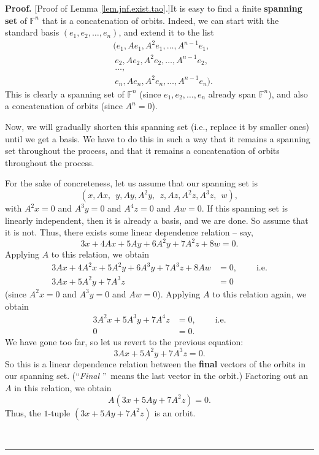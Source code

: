 \documentclass[numbers=enddot,12pt,final,onecolumn,notitlepage]{scrartcl}%
\numberwithin{exer}{subsection}
\theoremstyle{definition}
\newenvironment{proof}[1][Proof]{\noindent\textbf{#1.} }{\ \rule{0.5em}{0.5em}}
\begin{document}
\begin{proof}
[Proof of Lemma \ref{lem.jnf.exist.tao}.]It is easy to find a finite
\textbf{spanning set} of $\mathbb{F}^{n}$ that is a concatenation of orbits.
Indeed, we can start with the standard basis $\left(  e_{1},e_{2},\ldots
,e_{n}\right)  $, and extend it to the list%
\begin{align*}
&  (e_{1},Ae_{1},A^{2}e_{1},\ldots,A^{n-1}e_{1},\\
&  \ e_{2},Ae_{2},A^{2}e_{2},\ldots,A^{n-1}e_{2},\\
&  \ \ldots,\\
&  \ e_{n},Ae_{n},A^{2}e_{n},\ldots,A^{n-1}e_{n}).
\end{align*}
This is clearly a spanning set of $\mathbb{F}^{n}$ (since $e_{1},e_{2}%
,\ldots,e_{n}$ already span $\mathbb{F}^{n}$), and also a concatenation of
orbits (since $A^{n}=0$).

Now, we will gradually shorten this spanning set (i.e., replace it by smaller
ones) until we get a basis. We have to do this in such a way that it remains a
spanning set throughout the process, and that it remains a concatenation of
orbits throughout the process.

For the sake of concreteness, let us assume that our spanning set is%
\[
\left(  x,Ax,\ \ y,Ay,A^{2}y,\ \ z,Az,A^{2}z,A^{3}z,\ \ w\right)  ,
\]
with $A^{2}x=0$ and $A^{3}y=0$ and $A^{4}z=0$ and $Aw=0$. If this spanning set
is linearly independent, then it is already a basis, and we are done. So
assume that it is not. Thus, there exists some linear dependence relation --
say,%
\[
3x+4Ax+5Ay+6A^{2}y+7A^{2}z+8w=0.
\]
Applying $A$ to this relation, we obtain%
\begin{align*}
3Ax+4A^{2}x+5A^{2}y+6A^{3}y+7A^{3}z+8Aw  &  =0,\ \ \ \ \ \ \ \ \ \ \text{i.e.}%
\\
3Ax+5A^{2}y+7A^{3}z  &  =0
\end{align*}
(since $A^{2}x=0$ and $A^{3}y=0$ and $Aw=0$). Applying $A$ to this relation
again, we obtain%
\begin{align*}
3A^{2}x+5A^{3}y+7A^{4}z  &  =0,\ \ \ \ \ \ \ \ \ \ \text{i.e.}\\
0  &  =0.
\end{align*}
We have gone too far, so let us revert to the previous equation:%
\[
3Ax+5A^{2}y+7A^{3}z=0.
\]
So this is a linear dependence relation between the \textbf{final} vectors of
the orbits in our spanning set. (\textquotedblleft\emph{Final}%
\textquotedblright\ means the last vector in the orbit.) Factoring out an $A$
in this relation, we obtain%
\[
A\left(  3x+5Ay+7A^{2}z\right)  =0.
\]
Thus, the $1$-tuple $\left(  3x+5Ay+7A^{2}z\right)  $ is an orbit.


\end{proof}
\end{document}
